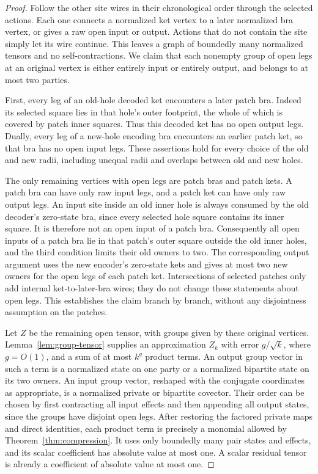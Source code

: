 \begin{proof}
Follow the other site wires in their chronological order through the
selected actions.  Each one connects a normalized ket vertex to a later
normalized bra vertex, or gives a raw open input or output.  Actions that
do not contain the site simply let its wire continue.  This leaves a graph
of boundedly many normalized tensors and no self-contractions.  We claim
that each nonempty group of open legs at an original vertex is either
entirely input or entirely output, and belongs to at most two parties.

First, every leg of an old-hole decoded ket encounters a later patch bra.
Indeed its selected square lies in that hole's outer footprint, the whole
of which is covered by patch inner squares.  Thus this decoded ket has no
open output legs.  Dually, every leg of a new-hole encoding bra encounters
an earlier patch ket, so that bra has no open input legs.  These assertions
hold for every choice of the old and new radii, including unequal radii
and overlaps between old and new holes.

The only remaining vertices with open legs are patch bras and patch kets.
A patch bra can have only raw input legs, and a patch ket can have only raw
output legs.  An input site inside an old inner hole is always consumed by
the old decoder's zero-state bra, since every selected hole square contains
its inner square.  It is therefore not an open input of a patch bra.
Consequently all open inputs of a patch bra lie in that patch's outer
square outside the old inner holes, and the third condition limits their
old owners to two.  The corresponding output argument uses the new
encoder's zero-state kets and gives at most two new owners for the open
legs of each patch ket.  Intersections of selected patches only add
internal ket-to-later-bra wires; they do not change these statements about
open legs.  This establishes the claim branch by branch, without any
disjointness assumption on the patches.

Let $Z$ be the remaining open tensor, with groups given by these original
vertices.  Lemma~\ref{lem:group-tensor} supplies an approximation $Z_k$ with
error $g/\sqrt{k}$, where $g=O(1)$, and a sum of at most $k^g$ product terms.
An output group vector in such a term is a normalized state on one party
or a normalized bipartite state on its two owners.  An input group vector,
reshaped with the conjugate coordinates as appropriate, is a normalized
private or bipartite covector.  Their order can be chosen by first
contracting all input effects and then appending all output states, since
the groups have disjoint open legs.  After restoring the factored private
maps and direct identities, each product term is precisely a monomial
allowed by Theorem~\ref{thm:compression}.  It uses only boundedly many pair
states and effects, and its scalar coefficient has absolute value at
most one.  A scalar residual tensor is already a coefficient of absolute
value at most one.


\end{proof}
